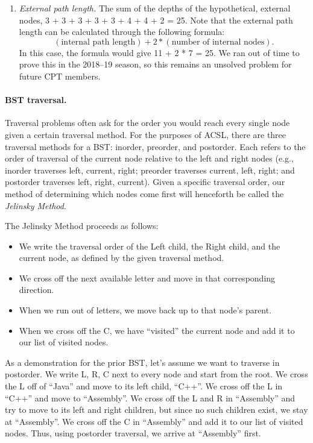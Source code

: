 \documentclass{pset_template}
\begin{document}
\begin{enumerate}
\item \textit{External path length.}
The sum of the depths of the hypothetical, external nodes,
3 + 3 + 3 + 3 + 3 + 4 + 4 + 2 = 25.
Note that the external path length can be calculated through the following formula:
\begin{equation*}
(\text{internal path length}) + 2 * (\text{number of internal nodes}).
\end{equation*}
In this case, the formula would give 11 + 2 * 7 = 25.
We ran out of time to prove this in the 2018--19 season, so this remains
an unsolved problem for future CPT members.
\end{enumerate}

\paragraph{BST traversal.}
Traversal problems often ask for the order you would reach every single node
given a certain traversal method.
For the purposes of ACSL, there are three traversal methods for a BST:
inorder, preorder, and postorder.
Each refers to the order of traversal of the current node relative to the
left and right nodes (e.g., inorder traverses left, current, right;
preorder traverses current, left, right;
and postorder traverses left, right, current).
Given a specific traversal order, our method of determining which nodes
come first will henceforth be called the \textit{Jelinsky Method}.

The Jelinsky Method proceeds as follows:
\begin{itemize}
\item We write the traversal order of the Left child, the Right child,
and the current node, as defined by the given traversal method.
\item We cross off
the next available letter and move in that corresponding direction.
\item When we run out of letters, we move
back up to that node's parent.
\item When we cross off the C, we have ``visited'' the current node
and add it to our list of visited nodes.
\end{itemize}

As a demonstration for the prior BST, let's assume we want to traverse in postorder.
We write L, R, C next to every node and start from the root.
We cross the L off of ``Java'' and move to its left child, ``C++''.
We cross off the L in ``C++'' and move to ``Assembly''.
We cross off the L and R in ``Assembly'' and try to move to its left and right children,
but since no such children exist, we stay at ``Assembly''.
We cross off the C in ``Assembly'' and add it to our list of visited nodes.
Thus, using postorder traversal, we arrive at ``Assembly'' first.
\end{document}
